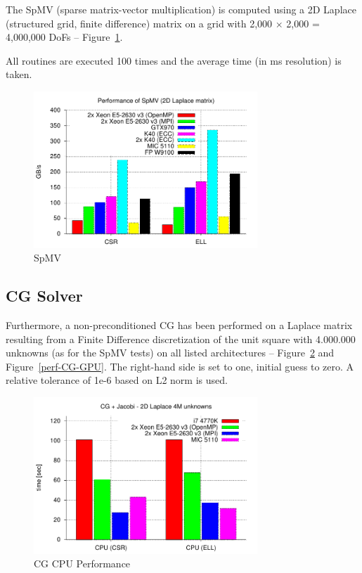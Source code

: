 The SpMV (sparse matrix-vector multiplication) is computed using a 2D Laplace (structured grid, finite difference) matrix on a grid with 2,000 $\times$ 2,000 = 4,000,000 DoFs -- Figure~\ref{perf-BLAS2}.

All routines are executed 100 times and the average time (in ms resolution) is taken.

\begin{figure}[h!]
\centering
\includegraphics[width=0.75\textwidth]{./fig/perf/BLAS2.pdf}
\caption{SpMV}
\label{perf-BLAS2}
\end{figure}

\subsection{CG Solver}

Furthermore, a non-preconditioned CG has been performed on a Laplace matrix resulting from a Finite
Difference discretization of the unit square with 4.000.000 unknowns (as for the SpMV tests) on all
listed architectures -- Figure~\ref{perf-CG-CPU} and Figure~\ref{perf-CG-GPU}. 
The right-hand side is set to one, initial guess to zero. A relative tolerance of 1e-6 based on L2 norm is used.

\begin{figure}[h!]
\centering
\includegraphics[width=0.75\textwidth]{./fig/perf/CG_CPU.pdf}
\caption{CG CPU Performance}
\label{perf-CG-CPU}
\end{figure}

